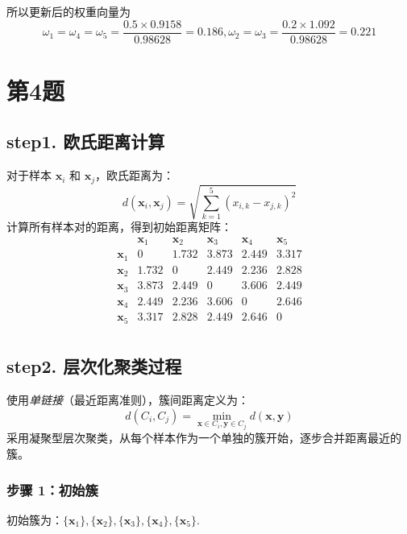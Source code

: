 \documentclass{article}
\begin{document}
所以更新后的权重向量为
\[\omega_1=\omega_4=\omega_5=\frac{0.5\times0.9158}{0.98628}=0.186,\omega_2=\omega_3=\frac{0.2\times1.092}{0.98628}=0.221\]

\section*{第4题}

\subsection*{step1. 欧氏距离计算}
对于样本 \( \mathbf{x}_i \) 和 \( \mathbf{x}_j \)，欧氏距离为：
\[
d(\mathbf{x}_i, \mathbf{x}_j) = \sqrt{\sum_{k=1}^5 (x_{i,k} - x_{j,k})^2}
\]
计算所有样本对的距离，得到初始距离矩阵：
\[
\begin{array}{c|ccccc}
 & \mathbf{x}_1 & \mathbf{x}_2 & \mathbf{x}_3 & \mathbf{x}_4 & \mathbf{x}_5 \\
\hline
\mathbf{x}_1 & 0 & 1.732 & 3.873 & 2.449 & 3.317 \\
\mathbf{x}_2 & 1.732 & 0 & 2.449 & 2.236 & 2.828 \\
\mathbf{x}_3 & 3.873 & 2.449 & 0 & 3.606 & 2.449 \\
\mathbf{x}_4 & 2.449 & 2.236 & 3.606 & 0 & 2.646 \\
\mathbf{x}_5 & 3.317 & 2.828 & 2.449 & 2.646 & 0 \\
\end{array}
\]

\subsection*{step2. 层次化聚类过程}
使用\emph{单链接}（最近距离准则），簇间距离定义为：
\[
d(C_i, C_j) = \min_{\mathbf{x} \in C_i, \mathbf{y} \in C_j} d(\mathbf{x}, \mathbf{y})
\]
采用凝聚型层次聚类，从每个样本作为一个单独的簇开始，逐步合并距离最近的簇。

\subsubsection*{步骤 1：初始簇}
初始簇为：\( \{ \mathbf{x}_1 \}, \{ \mathbf{x}_2 \}, \{ \mathbf{x}_3 \}, \{ \mathbf{x}_4 \}, \{ \mathbf{x}_5 \} \).
\end{document}
